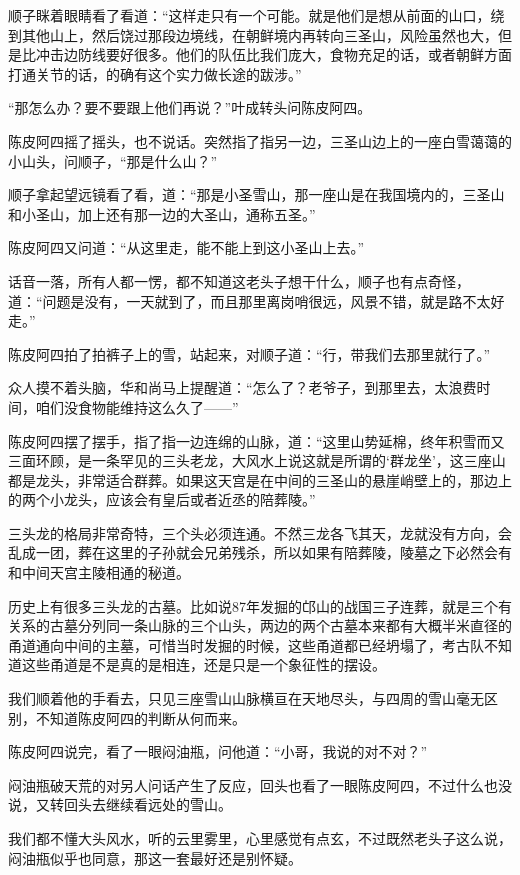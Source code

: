 顺子眯着眼睛看了看道：“这样走只有一个可能。就是他们是想从前面的山口，绕到其他山上，然后饶过那段边境线，在朝鲜境内再转向三圣山，风险虽然也大，但是比冲击边防线要好很多。他们的队伍比我们庞大，食物充足的话，或者朝鲜方面打通关节的话，的确有这个实力做长途的跋涉。”

“那怎么办？要不要跟上他们再说？”叶成转头问陈皮阿四。

陈皮阿四摇了摇头，也不说话。突然指了指另一边，三圣山边上的一座白雪蔼蔼的小山头，问顺子，“那是什么山？”

顺子拿起望远镜看了看，道：“那是小圣雪山，那一座山是在我国境内的，三圣山和小圣山，加上还有那一边的大圣山，通称五圣。”

陈皮阿四又问道：“从这里走，能不能上到这小圣山上去。”

话音一落，所有人都一愣，都不知道这老头子想干什么，顺子也有点奇怪，道：“问题是没有，一天就到了，而且那里离岗哨很远，风景不错，就是路不太好走。”

陈皮阿四拍了拍裤子上的雪，站起来，对顺子道：“行，带我们去那里就行了。”

众人摸不着头脑，华和尚马上提醒道：“怎么了？老爷子，到那里去，太浪费时间，咱们没食物能维持这么久了——”

陈皮阿四摆了摆手，指了指一边连绵的山脉，道：“这里山势延棉，终年积雪而又三面环顾，是一条罕见的三头老龙，大风水上说这就是所谓的‘群龙坐’，这三座山都是龙头，非常适合群葬。如果这天宫是在中间的三圣山的悬崖峭壁上的，那边上的两个小龙头，应该会有皇后或者近丞的陪葬陵。”

三头龙的格局非常奇特，三个头必须连通。不然三龙各飞其天，龙就没有方向，会乱成一团，葬在这里的子孙就会兄弟残杀，所以如果有陪葬陵，陵墓之下必然会有和中间天宫主陵相通的秘道。

历史上有很多三头龙的古墓。比如说87年发掘的邙山的战国三子连葬，就是三个有关系的古墓分列同一条山脉的三个山头，两边的两个古墓本来都有大概半米直径的甬道通向中间的主墓，可惜当时发掘的时候，这些甬道都已经坍塌了，考古队不知道这些甬道是不是真的是相连，还是只是一个象征性的摆设。

我们顺着他的手看去，只见三座雪山山脉横亘在天地尽头，与四周的雪山毫无区别，不知道陈皮阿四的判断从何而来。

陈皮阿四说完，看了一眼闷油瓶，问他道：“小哥，我说的对不对？”

闷油瓶破天荒的对另人问话产生了反应，回头也看了一眼陈皮阿四，不过什么也没说，又转回头去继续看远处的雪山。

我们都不懂大头风水，听的云里雾里，心里感觉有点玄，不过既然老头子这么说，闷油瓶似乎也同意，那这一套最好还是别怀疑。

